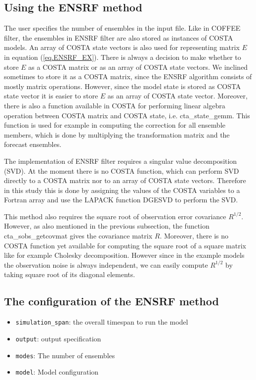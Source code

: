 \subsection{Using the ENSRF method}

The user specifies the number of ensembles in the input file. Like in COFFEE
filter, the ensembles in ENSRF filter are also stored as instances of COSTA
models. An array of COSTA state vectors is also used for representing matrix
$E$ in equation (\ref{eq.ENSRF_EX}). There is always a decision to make whether
to store $E$ as a COSTA matrix or as an array of COSTA state vectors. We
inclined sometimes to store it as a COSTA matrix, since the ENSRF algorithm
consists of mostly matrix operations. However, since the model state is stored
as COSTA state vector it is easier to store $E$ as an array of COSTA state
vector. Moreover, there is also a function available in COSTA for performing
linear algebra operation between COSTA matrix and COSTA state, i.e.
cta\_state\_gemm. This function is used for example in computing the correction
for all ensemble members, which is done by multiplying the transformation
matrix and the forecast ensembles.

The implementation of ENSRF filter requires a singular value decomposition
(SVD). At the moment there is no COSTA function, which can perform SVD directly
to a COSTA matrix nor to an array of COSTA state vectors. Therefore in this
study this is done by assigning the values of the COSTA variables to a Fortran
array and use the LAPACK function DGESVD to perform the SVD.

This method also requires the square root of observation error covariance
$R^{1/2}$. However, as also mentioned in the previous subsection, the function
cta\_sobs\_getcovmat gives the covariance matrix $R$. Moreover, there is no
COSTA function yet available for computing the square root of a square matrix
like for example Cholesky decomposition. However since in the example models
the observation noise is always independent, we can easily compute $R^{1/2}$ by
taking square root of its diagonal elements.

\subsection{The configuration of the ENSRF method}
\begin{itemize}
\item {\tt simulation\_span}: the overall timespan to run the model
\item {\tt output}: output specification
\item {\tt modes}: The number of ensembles
\item {\tt model}: Model configuration
\end{itemize}

